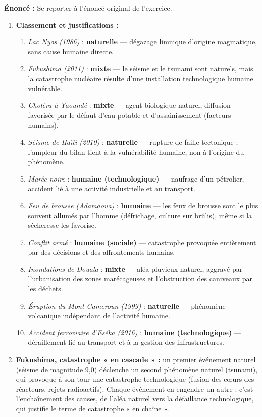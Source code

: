 \documentclass[11pt]{article}
\begin{document}
\begin{corrige}
\textbf{Énoncé :} Se reporter à l'énoncé original de l'exercice.
\tcblower
\begin{enumerate}
\item \textbf{Classement et justifications :}
\begin{enumerate}
\item \emph{Lac Nyos (1986)} : \textbf{naturelle} — dégazage limnique d'origine magmatique, sans cause humaine directe.
\item \emph{Fukushima (2011)} : \textbf{mixte} — le séisme et le tsunami sont naturels, mais la catastrophe nucléaire résulte d'une installation technologique humaine vulnérable.
\item \emph{Choléra à Yaoundé} : \textbf{mixte} — agent biologique naturel, diffusion favorisée par le défaut d'eau potable et d'assainissement (facteurs humains).
\item \emph{Séisme de Haïti (2010)} : \textbf{naturelle} — rupture de faille tectonique ; l'ampleur du bilan tient à la vulnérabilité humaine, non à l'origine du phénomène.
\item \emph{Marée noire} : \textbf{humaine (technologique)} — naufrage d'un pétrolier, accident lié à une activité industrielle et au transport.
\item \emph{Feu de brousse (Adamaoua)} : \textbf{humaine} — les feux de brousse sont le plus souvent allumés par l'homme (défrichage, culture sur brûlis), même si la sécheresse les favorise.
\item \emph{Conflit armé} : \textbf{humaine (sociale)} — catastrophe provoquée entièrement par des décisions et des affrontements humains.
\item \emph{Inondations de Douala} : \textbf{mixte} — aléa pluvieux naturel, aggravé par l'urbanisation des zones marécageuses et l'obstruction des caniveaux par les déchets.
\item \emph{Éruption du Mont Cameroun (1999)} : \textbf{naturelle} — phénomène volcanique indépendant de l'activité humaine.
\item \emph{Accident ferroviaire d'Eséka (2016)} : \textbf{humaine (technologique)} — déraillement lié au transport et à la gestion des infrastructures.
\end{enumerate}
\item \textbf{Fukushima, catastrophe « en cascade » :} un premier événement naturel (séisme de magnitude 9,0) déclenche un second phénomène naturel (tsunami), qui provoque à son tour une catastrophe technologique (fusion des cœurs des réacteurs, rejets radioactifs). Chaque événement en engendre un autre : c'est l'enchaînement des causes, de l'aléa naturel vers la défaillance technologique, qui justifie le terme de catastrophe « en chaîne ».
\end{enumerate}
\end{corrige}
\end{document}
